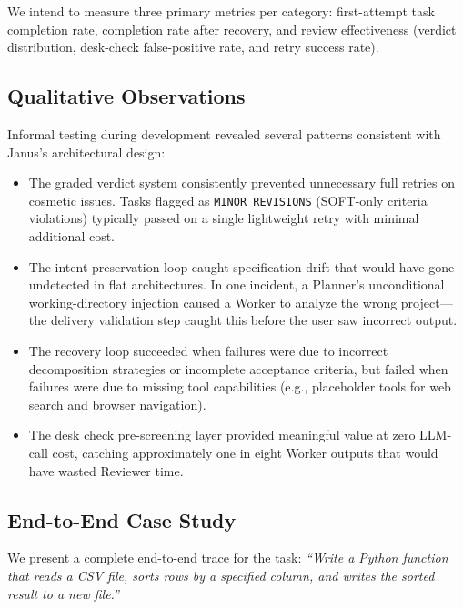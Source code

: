\documentclass[11pt,a4paper]{article}
\begin{document}
We intend to measure three primary metrics per category: first-attempt
task completion rate, completion rate after recovery, and review
effectiveness (verdict distribution, desk-check false-positive rate, and
retry success rate).

\subsection{Qualitative Observations}

Informal testing during development revealed several patterns consistent
with Janus's architectural design:

\begin{itemize}[leftmargin=*,itemsep=2pt]
    \item The graded verdict system consistently prevented unnecessary
    full retries on cosmetic issues. Tasks flagged as
    \texttt{MINOR\_REVISIONS} (SOFT-only criteria violations) typically
    passed on a single lightweight retry with minimal additional cost.

    \item The intent preservation loop caught specification drift that
    would have gone undetected in flat architectures. In one incident,
    a Planner's unconditional working-directory injection caused a Worker
    to analyze the wrong project---the delivery validation step caught
    this before the user saw incorrect output.

    \item The recovery loop succeeded when failures were due to incorrect
    decomposition strategies or incomplete acceptance criteria, but
    failed when failures were due to missing tool capabilities (e.g.,
    placeholder tools for web search and browser navigation).

    \item The desk check pre-screening layer provided meaningful value at
    zero LLM-call cost, catching approximately one in eight Worker
    outputs that would have wasted Reviewer time.
\end{itemize}

\subsection{End-to-End Case Study}

We present a complete end-to-end trace for the task: \emph{``Write a
Python function that reads a CSV file, sorts rows by a specified column,
and writes the sorted result to a new file.''}
\end{document}
